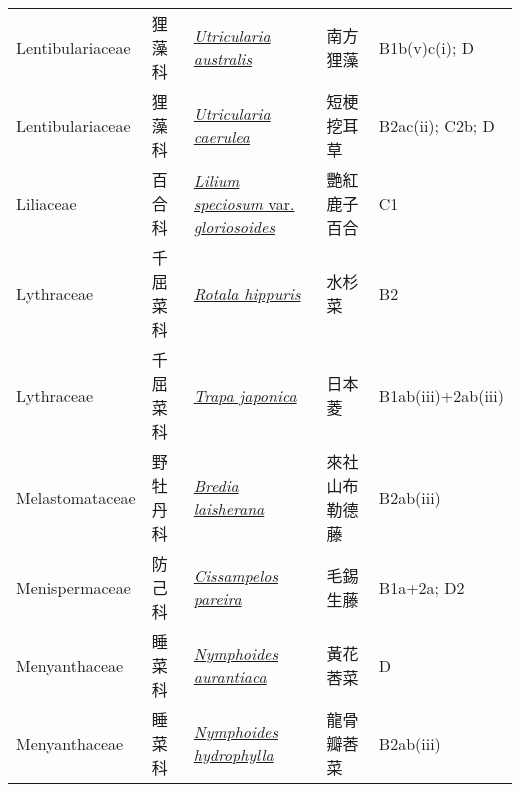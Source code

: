 {\begin{longtable}{L{2.5cm}L{2cm}L{5cm}L{2.5cm}L{3cm}}
    Lentibulariaceae & 狸藻科 & \href{http://www.theplantlist.org/tpl1.1/search?q=Utricularia+australis}{\textit{Utricularia australis} } & 南方狸藻 & B1b(v)c(i); D    \\
    Lentibulariaceae & 狸藻科 & \href{http://www.theplantlist.org/tpl1.1/search?q=Utricularia+caerulea}{\textit{Utricularia caerulea} } & 短梗挖耳草 & B2ac(ii); C2b; D    \\
    Liliaceae & 百合科 & \href{http://www.theplantlist.org/tpl1.1/search?q=Lilium+speciosum+var.+gloriosoides}{\textit{Lilium speciosum} var. \textit{gloriosoides} } & 艷紅鹿子百合 & C1    \\
    Lythraceae & 千屈菜科 & \href{http://www.theplantlist.org/tpl1.1/search?q=Rotala+hippuris}{\textit{Rotala hippuris} } & 水杉菜 & B2    \\
    Lythraceae & 千屈菜科 & \href{http://www.theplantlist.org/tpl1.1/search?q=Trapa+japonica}{\textit{Trapa japonica} } & 日本菱 & B1ab(iii)+2ab(iii)    \\
    Melastomataceae & 野牡丹科 & \href{http://www.theplantlist.org/tpl1.1/search?q=Bredia+laisherana}{\textit{Bredia laisherana} } & 來社山布勒德藤 & B2ab(iii)    \\
    Menispermaceae & 防己科 & \href{http://www.theplantlist.org/tpl1.1/search?q=Cissampelos+pareira}{\textit{Cissampelos pareira} } & 毛錫生藤 & B1a+2a; D2    \\
    Menyanthaceae & 睡菜科 & \href{http://www.theplantlist.org/tpl1.1/search?q=Nymphoides+aurantiaca}{\textit{Nymphoides aurantiaca} } & 黃花莕菜 & D    \\
    Menyanthaceae & 睡菜科 & \href{http://www.theplantlist.org/tpl1.1/search?q=Nymphoides+hydrophylla}{\textit{Nymphoides hydrophylla} } & 龍骨瓣莕菜 & B2ab(iii)    \\

\end{longtable}}
